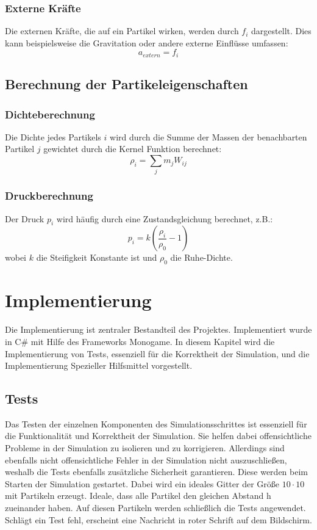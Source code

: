 \documentclass[a4paper, 12pt]{article}
\begin{document}
\subsubsection{Externe Kräfte}
Die externen Kräfte, die auf ein Partikel wirken, werden durch \( f_i \) dargestellt. Dies kann beispielsweise die Gravitation oder andere externe Einflüsse umfassen:
\begin{equation}
	a_{extern} = f_i
\end{equation}
\subsection{Berechnung der Partikeleigenschaften}
\subsubsection{Dichteberechnung}
Die Dichte jedes Partikels \(i\) wird durch die Summe der Massen der benachbarten Partikel \(j\) gewichtet durch die Kernel Funktion berechnet:
\begin{equation} \label{equ:localDichte}
	\rho_i = \sum_j m_j W_{ij}
\end{equation}

\subsubsection{Druckberechnung}
Der Druck \(p_i\) wird häufig durch eine Zustandsgleichung \cite{Adams2007} berechnet, z.B.:
\begin{equation} \label{equ:lokalDruck}
	p_i = k (\frac{\rho_i}{\rho_0} - 1)
\end{equation}
wobei \(k\) die Steifigkeit Konstante ist und \(\rho_0\) die Ruhe-Dichte.

\section{Implementierung} \label{Kap:Implementierung}
Die Implementierung ist zentraler Bestandteil des Projektes. Implementiert wurde in C\# mit Hilfe des Frameworks Monogame. In diesem Kapitel wird die Implementierung von Tests, essenziell für die Korrektheit der Simulation, und die Implementierung Spezieller Hilfsmittel vorgestellt. 

\subsection{Tests}
Das Testen der einzelnen Komponenten des Simulationsschrittes ist essenziell für die Funktionalität und Korrektheit der Simulation. Sie helfen dabei offensichtliche Probleme in der Simulation zu isolieren und zu korrigieren. Allerdings sind ebenfalls nicht offensichtliche Fehler in der Simulation nicht auszuschließen, weshalb die Tests ebenfalls zusätzliche Sicherheit garantieren. Diese werden beim Starten der Simulation gestartet. Dabei wird ein ideales Gitter der Größe  $10 \cdot 10$  mit Partikeln erzeugt. \glqq Ideale\grqq{}, dass alle Partikel den gleichen Abstand h zueinander haben. Auf diesen Partikeln werden schließlich die Tests angewendet. Schlägt ein Test fehl, erscheint eine Nachricht in roter Schrift auf dem Bildschirm. 
\end{document}
